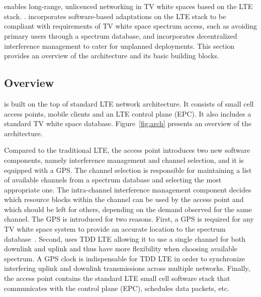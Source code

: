 \section{\cf}


\cf enables long-range, unlicenced networking in TV white spaces 
based on the LTE stack. . \cf incorporates software-based adaptations on the LTE stack to be compliant with
 requirements of TV white space spectrum access, such as avoiding primary users through a spectrum database, and incorporates decentralized interference management to cater for unplanned deployments. 
This section provides an overview of the \cf architecture and its basic building blocks. 



\subsection{Overview}

\cf is built on the top of standard LTE network architecture. It consists of small cell access points, mobile clients and an LTE control plane (EPC). It also includes a standard TV white space database. Figure~\ref{fig:arch} presents an overview of the \cf architecture.

Compared to the traditional LTE, the \cf access point introduces two new software components, namely interference management and channel selection, and it is equipped with a GPS.
The channel selection is responsible for maintaining a list of available channels from a spectrum database and selecting the most appropriate one. 
The intra-channel interference management component decides which resource blocks within the channel can be used by the access point and which should be left for others, 
depending on the demand observed for the same channel. The GPS is introduced for two reasons. First, a GPS is required for any TV white space system to provide an accurate location to the spectrum database~\cite{Rice_af}. 
Second, \cf uses TDD LTE allowing it to use a single channel for both downlink and uplink and thus have more flexibility when choosing available spectrum. A GPS clock is indispensable for TDD LTE in order to synchronize interfering uplink and downlink transmissions across multiple networks. Finally, the access point contains the standard LTE small cell software stack that communicates with the control plane (EPC), 
schedules data packets, etc. 


